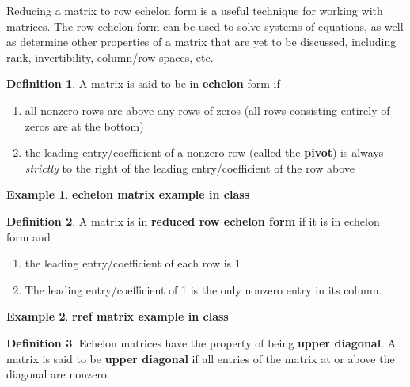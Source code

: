 \documentclass[
]{book}
\theoremstyle{definition}
\newtheorem{definition}{Definition}[chapter]
\theoremstyle{definition}
\newtheorem{example}{Example}[chapter]
\theoremstyle{definition}
\theoremstyle{definition}
\theoremstyle{remark}
\begin{document}
Reducing a matrix to row echelon form is a useful technique for working with matrices. The row echelon form can be used to solve systems of equations, as well as determine other properties of a matrix that are yet to be discussed, including rank, invertibility, column/row spaces, etc.

\begin{definition}

A matrix is said to be in \textbf{echelon} form if

\begin{enumerate}
\def\labelenumi{\arabic{enumi})}
\item
  all nonzero rows are above any rows of zeros (all rows consisting entirely of zeros are at the bottom)
\item
  the leading entry/coefficient of a nonzero row (called the \textbf{pivot}) is always \emph{strictly} to the right of the leading entry/coefficient of the row above
\end{enumerate}

\end{definition}

\begin{example}
\textbf{echelon matrix example in class}
\end{example}

\begin{definition}

A matrix is in \textbf{reduced row echelon form} if it is in echelon form and

\begin{enumerate}
\def\labelenumi{\arabic{enumi})}
\item
  the leading entry/coefficient of each row is 1
\item
  The leading entry/coefficient of 1 is the only nonzero entry in its column.
\end{enumerate}

\end{definition}

\begin{example}
\textbf{rref matrix example in class}
\end{example}

\begin{definition}
Echelon matrices have the property of being \textbf{upper diagonal}. A matrix is said to be \textbf{upper diagonal} if all entries of the matrix at or above the diagonal are nonzero.
\end{definition}
\end{document}

